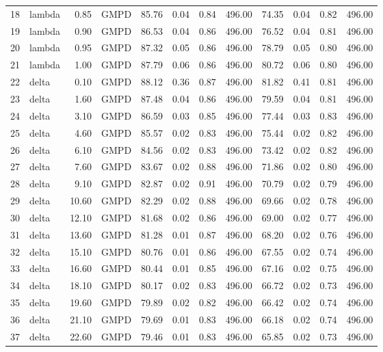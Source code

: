 \begin{table}[ht]
\begin{tabular}{rlrlrrrrrrrr}
  18 & lambda & 0.85 & GMPD & 85.76 & 0.04 & 0.84 & 496.00 & 74.35 & 0.04 & 0.82 & 496.00 \\ 
  19 & lambda & 0.90 & GMPD & 86.53 & 0.04 & 0.86 & 496.00 & 76.52 & 0.04 & 0.81 & 496.00 \\ 
  20 & lambda & 0.95 & GMPD & 87.32 & 0.05 & 0.86 & 496.00 & 78.79 & 0.05 & 0.80 & 496.00 \\ 
  21 & lambda & 1.00 & GMPD & 87.79 & 0.06 & 0.86 & 496.00 & 80.72 & 0.06 & 0.80 & 496.00 \\ 
  22 & delta & 0.10 & GMPD & 88.12 & 0.36 & 0.87 & 496.00 & 81.82 & 0.41 & 0.81 & 496.00 \\ 
  23 & delta & 1.60 & GMPD & 87.48 & 0.04 & 0.86 & 496.00 & 79.59 & 0.04 & 0.81 & 496.00 \\ 
  24 & delta & 3.10 & GMPD & 86.59 & 0.03 & 0.85 & 496.00 & 77.44 & 0.03 & 0.83 & 496.00 \\ 
  25 & delta & 4.60 & GMPD & 85.57 & 0.02 & 0.83 & 496.00 & 75.44 & 0.02 & 0.82 & 496.00 \\ 
  26 & delta & 6.10 & GMPD & 84.56 & 0.02 & 0.83 & 496.00 & 73.42 & 0.02 & 0.82 & 496.00 \\ 
  27 & delta & 7.60 & GMPD & 83.67 & 0.02 & 0.88 & 496.00 & 71.86 & 0.02 & 0.80 & 496.00 \\ 
  28 & delta & 9.10 & GMPD & 82.87 & 0.02 & 0.91 & 496.00 & 70.79 & 0.02 & 0.79 & 496.00 \\ 
  29 & delta & 10.60 & GMPD & 82.29 & 0.02 & 0.88 & 496.00 & 69.66 & 0.02 & 0.78 & 496.00 \\ 
  30 & delta & 12.10 & GMPD & 81.68 & 0.02 & 0.86 & 496.00 & 69.00 & 0.02 & 0.77 & 496.00 \\ 
  31 & delta & 13.60 & GMPD & 81.28 & 0.01 & 0.87 & 496.00 & 68.20 & 0.02 & 0.76 & 496.00 \\ 
  32 & delta & 15.10 & GMPD & 80.76 & 0.01 & 0.86 & 496.00 & 67.55 & 0.02 & 0.74 & 496.00 \\ 
  33 & delta & 16.60 & GMPD & 80.44 & 0.01 & 0.85 & 496.00 & 67.16 & 0.02 & 0.75 & 496.00 \\ 
  34 & delta & 18.10 & GMPD & 80.17 & 0.02 & 0.83 & 496.00 & 66.72 & 0.02 & 0.73 & 496.00 \\ 
  35 & delta & 19.60 & GMPD & 79.89 & 0.02 & 0.82 & 496.00 & 66.42 & 0.02 & 0.74 & 496.00 \\ 
  36 & delta & 21.10 & GMPD & 79.69 & 0.01 & 0.83 & 496.00 & 66.18 & 0.02 & 0.74 & 496.00 \\ 
  37 & delta & 22.60 & GMPD & 79.46 & 0.01 & 0.83 & 496.00 & 65.85 & 0.02 & 0.73 & 496.00 \\ 

\end{tabular}
\end{table}
